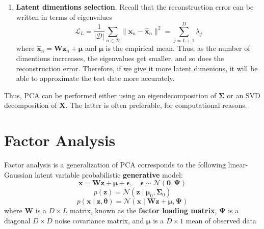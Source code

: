 \documentclass[11pt]{article}
\begin{document}
\begin{enumerate}
\[    \]
    Finally, if we want to approximately reconstruct the data, we have
    \[
    \hat{\mathbf{X}} = \mathbf{Z}\mathbf{W}^\mathsf{T} = \mathbf{U}_X \mathbf{S}_X \mathbf{V}_X^\mathsf{T}
    \]
    This is precisely the same as a \textbf{truncated SVD approximation}.
    \item \textbf{Latent dimentions selection}. Recall that the reconstruction error can be written in terms of eigenvalues 
    \[
    \mathcal{L}_L = \frac{1}{|\mathcal{D}|} \sum_{n \in \mathcal{D}} \|\boldsymbol{x}_n - \hat{\boldsymbol{x}}_n\|^2 = \sum_{j=L+1}^{D}\lambda_j
    \]
    where $\hat{\mathbf{x}}_n = \mathbf{Wz}_n + \mathbf{\mu}$ and $\mathbf{\mu}$ is the empirical mean. Thus, as the number of dimentions incrceases, the eigenvalues get smaller, and so does the reconstruction error. Therefore, if we give it more latent dimenions, it will be able to approximate the test date more accurately.
\end{enumerate}
Thus, PCA can be performed either using an eigendecomposition of $\boldsymbol{\Sigma}$ or an SVD decomposition of $\mathbf{X}$. The latter is often preferable, for computational reasons.

\clearpage
\section{Factor Analysis}
Factor analysis is a generalization of PCA corresponds to the following linear-Gaussian latent variable probabilistic \textbf{generative} model:
\[ 
\mathbf{x} = \mathbf{W}\mathbf{z} + \boldsymbol{\mu} + \boldsymbol{\epsilon}, \quad \boldsymbol{\epsilon} \sim \mathcal{N}(\mathbf{0}, \boldsymbol{\Psi})   
\]
\[
p(\boldsymbol{z}) = \mathcal{N}(\boldsymbol{z} \mid \boldsymbol{\mu}_0, \boldsymbol{\Sigma}_0)
\]
\[
p(\boldsymbol{x} \mid \boldsymbol{z}, \boldsymbol{\theta}) = \mathcal{N}(\boldsymbol{x} \mid \mathbf{W}\boldsymbol{z} + \boldsymbol{\mu}, \boldsymbol{\Psi})
\]
where $\mathbf{W}$ is a $D \times L$ matrix, known as the \textbf{factor loading matrix}, $\boldsymbol{\Psi}$ is a diagonal $D \times D$ noise covariance matrix, and $\boldsymbol{\mu}$ is a $D \times 1$ mean of observed data
\end{document}
